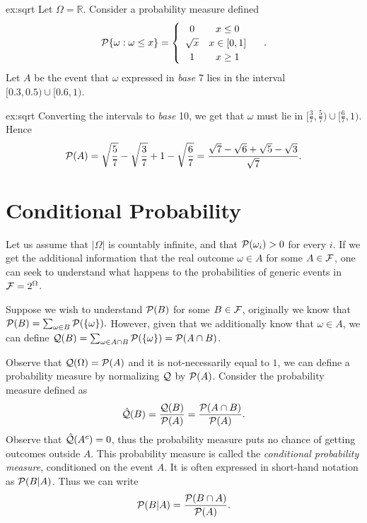 \begin{excr}{ex:sqrt}
Let $\Omega=\mathbb{R}$. Consider a probability measure defined
$$ \mathcal{P}\{\omega: \omega \leq x\}  = \begin{cases} \begin{array}{cc} 0 & x \leq 0\\ \sqrt{x} & x \in [0,1] \\ 1 & x \geq 1 \end{array}\end{cases}.$$
Let $A$ be the event that $\omega$ expressed in \textit{base} 7 lies in the interval $[0.3, 0.5) \cup [0.6,1)$.
\end{excr}
\begin{soln}{ex:sqrt}
Converting the intervals to \textit{base} 10, we get that $\omega$ must lie in $[\frac{3}{7},\frac{5}{7}) \cup [\frac{6}{7},1). $ Hence
$$ \mathcal{P}(A) = \sqrt{\frac{5}{7}} - \sqrt{\frac{3}{7}} + 1- \sqrt{\frac{6}{7}} = \frac{\sqrt{7} - \sqrt{6} + \sqrt{5} - \sqrt{3}}{\sqrt{7}}.$$
\end{soln}

\section{Conditional Probability}

Let us assume that $|\Omega|$ is countably infinite, and that $\mathcal{P}(\omega_i)>0$ for every $i$. If we get the additional information that the real outcome $\omega \in A$ for some $A \in \mathcal{F}$, one can seek to understand what happens to the probabilities of generic events in $\mathcal{F} = 2^\Omega$.

Suppose we wish to understand $\mathcal{P}(B)$ for some $B \in \mathcal{F}$, originally we know that $\mathcal{P}(B) = \sum_{\omega \in B} \mathcal{P}(\{\omega\}).$ However, given that we additionally know that $\omega \in A$, we can define $\mathcal{Q}(B) = \sum_{\omega \in A \cap B} \mathcal{P}(\{\omega\}) = \mathcal{P}(A \cap B)$.

Observe that $\mathcal{Q}(\Omega) = \mathcal{P}(A)$ and it is not-necessarily equal to $1$, we can define a probability measure by normalizing $\mathcal{Q}$ by $\mathcal{P}(A)$. Consider the probability measure defined as
$$ \hat{\mathcal{Q}}(B) = \frac{\mathcal{Q}(B)}{\mathcal{P}(A)} = \frac{\mathcal{P}(A \cap B) }{\mathcal{P}(A)}.$$
Observe that $\hat{\mathcal{Q}}(A^c)=0$, thus the probability measure puts no chance of getting outcomes outside $A$. This probability measure is called the \textit{conditional probability measure}, conditioned on the event $A$. It is often expressed in short-hand notation as $\mathcal{P}(B|A)$. Thus we can write
$$ \mathcal{P}(B|A) = \frac{\mathcal{P}(B \cap A)}{\mathcal{P}(A)}.$$

